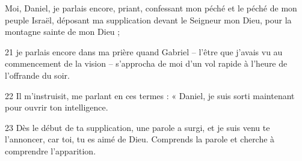 Moi, Daniel, je parlais encore, priant, confessant mon péché et le péché de mon peuple Israël, déposant ma supplication devant le Seigneur mon Dieu, pour la montagne sainte de mon Dieu ;

21 je parlais encore dans ma prière quand Gabriel – l’être que j’avais vu au commencement de la vision – s’approcha de moi d’un vol rapide à l’heure de l’offrande du soir.

22 Il m’instruisit, me parlant en ces termes : « Daniel, je suis sorti maintenant pour ouvrir ton intelligence.

23 Dès le début de ta supplication, une parole a surgi, et je suis venu te l’annoncer, car toi, tu es aimé de Dieu. Comprends la parole et cherche à comprendre l’apparition.
